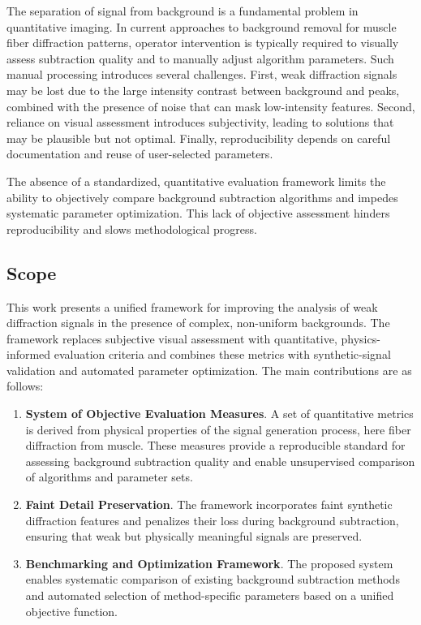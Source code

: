 \documentclass[iucr]{iucrjournals}
\begin{document}
The separation of signal from background is a fundamental problem in quantitative imaging. In current approaches to background removal for muscle fiber diffraction patterns, operator intervention is typically required to visually assess subtraction quality and to manually adjust algorithm parameters. Such manual processing introduces several challenges. First, weak diffraction signals may be lost due to the large intensity contrast between background and peaks, combined with the presence of noise that can mask low-intensity features. Second, reliance on visual assessment introduces subjectivity, leading to solutions that may be plausible but not optimal. Finally, reproducibility depends on careful documentation and reuse of user-selected parameters.

The absence of a standardized, quantitative evaluation framework limits the ability to objectively compare background subtraction algorithms and impedes systematic parameter optimization. This lack of objective assessment hinders reproducibility and slows methodological progress.

\subsection{Scope}

This work presents a unified framework for improving the analysis of weak diffraction signals in the presence of complex, non-uniform backgrounds. The framework replaces subjective visual assessment with quantitative, physics-informed evaluation criteria and combines these metrics with synthetic-signal validation and automated parameter optimization. The main contributions are as follows:

\begin{enumerate}

\item \textbf{System of Objective Evaluation Measures}. A set of quantitative metrics is derived from physical properties of the signal generation process, here fiber diffraction from muscle. These measures provide a reproducible standard for assessing background subtraction quality and enable unsupervised comparison of algorithms and parameter sets.

\item \textbf{Faint Detail Preservation}. The framework incorporates faint synthetic diffraction features and penalizes their loss during background subtraction, ensuring that weak but physically meaningful signals are preserved.

\item \textbf{Benchmarking and Optimization Framework}. The proposed system enables systematic comparison of existing background subtraction methods and automated selection of method-specific parameters based on a unified objective function.

\end{enumerate}
\end{document}
